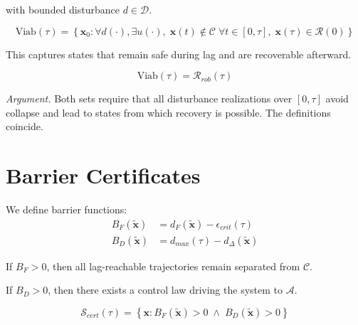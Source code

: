 \documentclass[letterpaper, 10 pt, conference]{ieeeconf}
\begin{document}
with bounded disturbance $d \in \mathcal{D}$.

\begin{definition}
\begin{equation}
\text{Viab}(\tau) =
\left\{
\mathbf{x}_0 :
\forall d(\cdot), \exists u(\cdot),\;
\mathbf{x}(t) \notin \mathcal{C} \;\forall t \in [0,\tau],\;
\mathbf{x}(\tau) \in \mathcal{R}(0)
\right\}
\end{equation}
\end{definition}

This captures states that remain safe during lag and are recoverable afterward.

\begin{theorem}
\begin{equation}
\text{Viab}(\tau) = \mathcal{R}_{rob}(\tau)
\end{equation}
\end{theorem}

\textit{Argument.}
Both sets require that all disturbance realizations over $[0,\tau]$ avoid collapse and lead to states from which recovery is possible. The definitions coincide.

\section{Barrier Certificates}

We define barrier functions:
\begin{align}
B_F(\tilde{\mathbf{x}}) &= d_F(\tilde{\mathbf{x}}) - \epsilon_{crit}(\tau) \\
B_D(\tilde{\mathbf{x}}) &= d_{max}(\tau) - d_\Delta(\tilde{\mathbf{x}})
\end{align}

\begin{assumption}
If $B_F > 0$, then all lag-reachable trajectories remain separated from $\mathcal{C}$.
\end{assumption}

\begin{assumption}[C2: Recoverability]
If $B_D > 0$, then there exists a control law driving the system to $\mathcal{A}$.
\end{assumption}

\begin{definition}
\begin{equation}
\mathcal{S}_{cert}(\tau) =
\left\{
\mathbf{x} :
B_F(\tilde{\mathbf{x}}) > 0
\;\wedge\;
B_D(\tilde{\mathbf{x}}) > 0
\right\}
\end{equation}
\end{definition}
\end{document}
